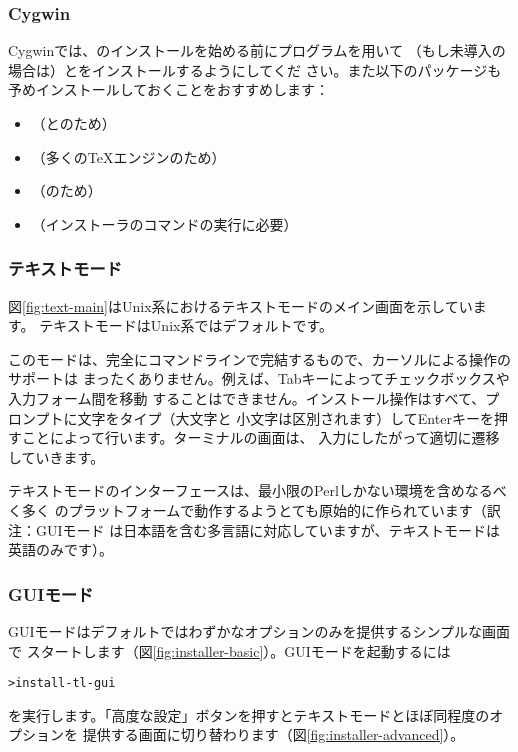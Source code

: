 \documentclass[uplatex,dvipdfmx]{jsarticle}
\begin{document}
\subsubsection{Cygwin}
\label{sec:cygwin}

Cygwinでは、\TL のインストールを始める前にプログラムを用いて
（もし未導入の場合は）とをインストールするようにしてくだ
さい。また以下のパッケージも予めインストールしておくことをおすすめします：
%
\begin{itemize}
\item {}（\XeTeX と\LuaTeX のため）
\item {}（多くの\TeX エンジンのため）
\item {}（のため）
\item {}（インストーラのコマンドの実行に必要）
\end{itemize}

\subsubsection{テキストモード}

図\ref{fig:text-main}はUnix系におけるテキストモードのメイン画面を示しています。
テキストモードはUnix系ではデフォルトです。

このモードは、完全にコマンドラインで完結するもので、カーソルによる操作のサポートは
まったくありません。例えば、Tabキーによってチェックボックスや入力フォーム間を移動
することはできません。インストール操作はすべて、プロンプトに文字をタイプ（大文字と
小文字は区別されます）してEnterキーを押すことによって行います。ターミナルの画面は、
入力にしたがって適切に遷移していきます。

テキストモードのインターフェースは、最小限のPerlしかない環境を含めなるべく多く
のプラットフォームで動作するようとても原始的に作られています（訳注：GUIモード
は日本語を含む多言語に対応していますが、テキストモードは英語のみです）。

\subsubsection{GUIモード}
\label{sec:graphical-inst}

GUIモードはデフォルトではわずかなオプションのみを提供するシンプルな画面で
スタートします（図\ref{fig:installer-basic}）。GUIモードを起動するには
%
\begin{alltt}
> install-tl -gui
\end{alltt}
%
を実行します。「高度な設定」ボタンを押すとテキストモードとほぼ同程度のオプションを
提供する画面に切り替わります（図\ref{fig:installer-advanced}）。
\end{document}
